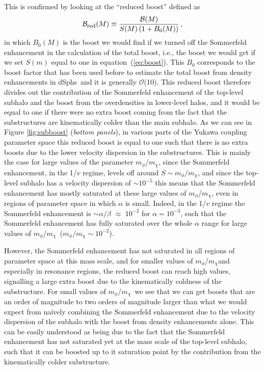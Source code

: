 \documentclass[aps,prd,twocolumn,amsmath,amssymb,floatfix,nofootinbib,10pt]{revtex4}
\newcommand{\ie}{i.e.}
\newcommand{\somm}{\ensuremath{S}}
\newcommand{\mdm}{\ensuremath{m_{\chi}}}
\newcommand{\mv}{\ensuremath{m_{\phi}}}
\newcommand{\eqnname}{equation}
\newcommand{\order}{\ensuremath{\mathcal{O}}}
\newcommand{\boost}{\ensuremath{B}}
\newcommand{\redboost}{\ensuremath{\mathcal{B}_{\mbox{{\footnotesize red}}}}}
\newcommand{\totalboost}{\ensuremath{\mathcal{B}}}
\newcommand{\dSphs}{dSphs}
\begin{document}
This is confirmed by looking at the ``reduced boost'' defined as
\begin{equation}\label{eq:redboost}
\redboost(M) \equiv \frac{\totalboost(M)}{\somm(M)\left(1+\boost_0(M)\right)}\, ,
\end{equation}
in which $\boost_0(M)$ is the boost we would find if we turned off the
Sommerfeld enhancement in the calculation of the total boost, \ie, the
boost we would get if we set $\somm(m)$ equal to one in \eqnname\
(\ref{eq:boost}). This $\boost_0$ corresponds to the boost factor that
has been used before to estimate the total boost from density
enhancements in \dSphs\ and it is generally \order(10). This reduced
boost therefore divides out the contribution of the Sommerfeld
enhancement of the top-level subhalo and the boost from the
overdensities in lower-level halos, and it would be equal to one if
there were no extra boost coming from the fact that the substructures
are kinematically colder than the main subhalo. As we can see in
Figure \ref{fig:subboost} (\emph{bottom panels}), in various parts of
the Yukawa coupling parameter space this reduced boost is equal to one
such that there is no extra boosts due to the lower velocity
dispersion in the substructures. This is mainly the case for large
values of the parameter \mv/\mdm, since the Sommerfeld enhancement, in
the 1/$v$ regime, levels off around $\somm \sim \mv/\mdm$, and since
the top-level subhalo has a velocity dispersion of $\sim 10^{-5}$ this
means that the Sommerfeld enhancement has mostly saturated at these
large values of \mv/\mdm, even in regions of parameter space in which
$\alpha$ is small. Indeed, in the 1/$v$ regime the Sommerfeld
enhancement is $\sim \alpha/\beta$ $\approx$ $10^{-2}$ for $\alpha =
10^{-3}$, such that the Sommerfeld enhancement has fully saturated
over the whole $\alpha$ range for large values of \mv/\mdm\ ($\mv/\mdm
\sim 10^{-2}$).


However, the Sommerfeld enhancement has not saturated in all regions
of parameter space at this mass scale, and for smaller values of
\mv/\mdm and especially in resonance regions, the reduced boost can
reach high values, signalling a large extra boost due to the
kinematically coldness of the substructure.  For small values of
\mv/\mdm\ we see that we can get boosts that are an order of magnitude
to two orders of magnitude larger than what we would expect from
naively combining the Sommerfeld enhancement due to the velocity
dispersion of the subhalo with the boost from density enhancements
alone. This can be easily understood as being due to the fact that the
Sommerfeld enhancement has not saturated yet at the mass scale of the
top-level subhalo, such that it can be boosted up to it saturation
point by the contribution from the kinematically colder substructure. 
\end{document}
